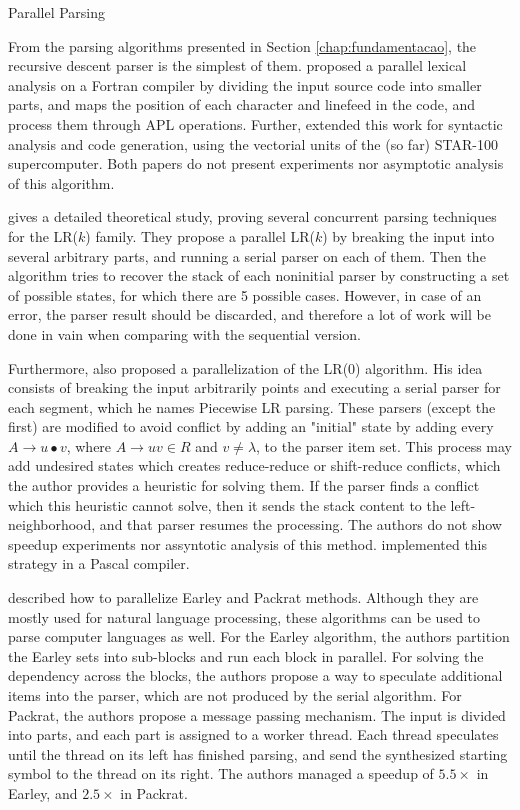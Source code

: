 \begin{section}{Parallel Parsing}

From the parsing algorithms presented in Section \ref{chap:fundamentacao}, the
recursive descent parser is the simplest of them.
\cite{Lincoln:1970:PPT:987475.987478} proposed a parallel lexical analysis on a
Fortran compiler by dividing the input source code into smaller parts, and maps
the position of each character and linefeed in the code, and process them
through APL operations. Further, \cite{Krohn:1975:PAC:390015.808414} extended
this work for syntactic analysis and code generation, using the vectorial units
of the (so far) STAR-100 supercomputer. Both papers do not present experiments
nor asymptotic analysis of this algorithm.

\cite{fischer1975parsing} gives a detailed theoretical study, proving several
concurrent parsing techniques for the LR($k$) family. They propose a parallel
LR($k$) by breaking the input into several arbitrary parts, and running a
serial parser on each of them. Then the algorithm tries to recover the stack of
each noninitial parser by constructing a set of possible states, for which
there are 5 possible cases. However, in case of an error, the parser result
should be discarded, and therefore a lot of work will be done in vain when
comparing with the sequential version.

Furthermore, \cite{Mickunas:1978:PCM:800127.804105} also proposed a parallelization
of the LR($0$) algorithm. His idea consists of breaking the input arbitrarily
points and executing a serial parser for each segment, which he names Piecewise
LR parsing. These parsers (except the first) are modified to avoid conflict by
adding an "initial" state by adding every $A \rightarrow u \bullet v$, where $A \rightarrow uv \in
R$ and $v \neq \lambda$, to the parser item set. This process may add undesired
states which creates reduce-reduce or shift-reduce conflicts, which the author
provides a heuristic for solving them.  If the parser finds a conflict which
this heuristic cannot solve, then it sends the stack content to the
left-neighborhood, and that parser resumes the processing. The authors
do not show speedup experiments nor assyntotic analysis of this method.
\cite{Pennello:1978:FMA:512760.512786} implemented this strategy in a Pascal
compiler.

\cite{fowler2009parallel} described how to parallelize Earley
and Packrat methods. Although they are mostly used for natural language
processing, these algorithms can be used to parse computer languages as well.
For the Earley algorithm, the authors partition the Earley sets into
sub-blocks and run each block in parallel. For solving the dependency across
the blocks, the authors propose a way to speculate additional items into the
parser, which are not produced by the serial algorithm. For Packrat, the authors
propose a message passing mechanism.  The input is divided into parts, and each
part is assigned to a worker thread. Each thread speculates until the
thread on its left has finished parsing, and send the synthesized starting
symbol to the thread on its right. The authors managed a speedup of $5.5\times$
in Earley, and $2.5\times$ in Packrat.


\end{section}
